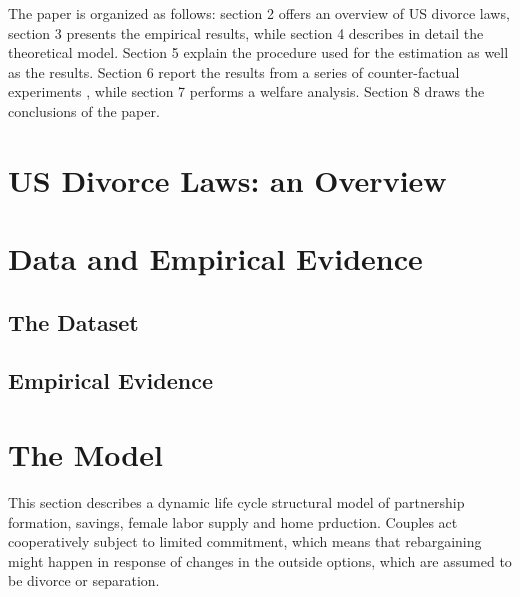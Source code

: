\documentclass[12pt]{article}
\numberwithin{table}{section}
\begin{document}
The paper is organized as follows: section 2 offers an overview of US divorce laws, section 3 presents the empirical results, while section 4 describes in detail the theoretical model. Section 5 explain the procedure used for the estimation as well as the results. Section 6 report the results from a series of counter-factual experiments , while section 7 performs a welfare analysis. Section 8 draws the conclusions of the paper.

\section{US Divorce Laws: an Overview}
\section{Data and Empirical Evidence}
\subsection{The Dataset}
\subsection{Empirical Evidence}
\section{The Model}
This section describes a dynamic life cycle structural model of partnership formation, savings, female labor supply and  home prduction. Couples act cooperatively subject to limited commitment, which means that rebargaining might happen in response of changes in the outside options, which are assumed to be divorce or separation.
\end{document}
